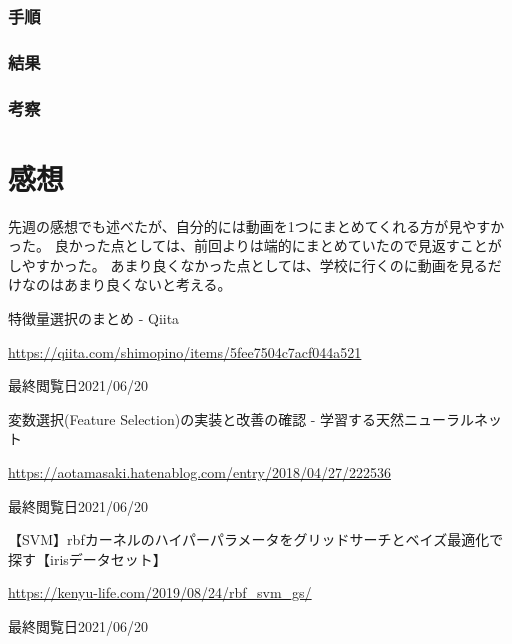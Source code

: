 \documentclass[12pt]{jarticle}
\begin{document}
\subsubsection*{手順}
\subsubsection*{結果}
\subsubsection*{考察}

\section{感想}
先週の感想でも述べたが、自分的には動画を1つにまとめてくれる方が見やすかった。
良かった点としては、前回よりは端的にまとめていたので見返すことがしやすかった。
あまり良くなかった点としては、学校に行くのに動画を見るだけなのはあまり良くないと考える。

\begin{thebibliography}{99}
    \label{sannkoubunnkenn_chapter}
    特徴量選択のまとめ - Qiita

    \url{https://qiita.com/shimopino/items/5fee7504c7acf044a521}

    最終閲覧日2021/06/20

    変数選択(Feature Selection)の実装と改善の確認 - 学習する天然ニューラルネット

    \url{https://aotamasaki.hatenablog.com/entry/2018/04/27/222536}

    最終閲覧日2021/06/20

    【SVM】rbfカーネルのハイパーパラメータをグリッドサーチとベイズ最適化で探す【irisデータセット】

    \url{https://kenyu-life.com/2019/08/24/rbf_svm_gs/}

    最終閲覧日2021/06/20
\end{thebibliography}

\clearpage
\appendix
\end{document}
